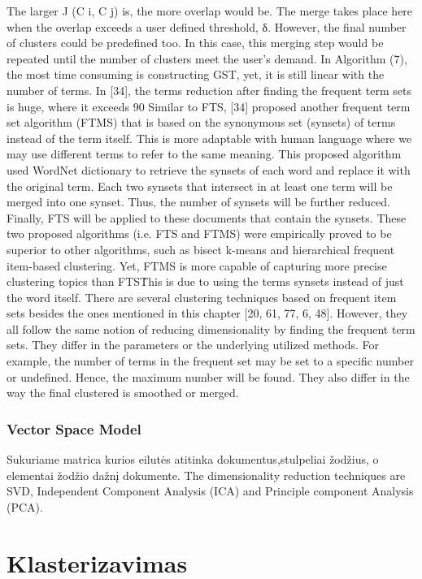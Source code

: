 \documentclass{VUMIFInfKursinis}
\begin{document}
			The larger J (C i, C j) is, the more overlap would be. The merge takes place here when the overlap exceeds a user defined threshold, δ. However, the final number of clusters could be predefined too. In this case, this merging step would be repeated until the number of clusters meet the user’s demand.
			In Algorithm (7), the most time consuming is constructing GST, yet, it is still linear with the number of terms. In [34], the terms reduction after finding the frequent term sets is huge, where it exceeds 90%
			Similar to FTS, [34] proposed another frequent term set algorithm (FTMS) that is based on the synonymous set (synsets) of terms instead of the term itself. This is more adaptable with human language where we may use different terms to refer to the same meaning.  This proposed algorithm used WordNet dictionary to retrieve the synsets of each word and replace it with the original term. Each two synsets that intersect in at least one term will be merged into one synset. Thus, the number of synsets will be further reduced. Finally, FTS will be applied to these documents that contain the synsets.
			These two proposed algorithms (i.e. FTS and FTMS) were empirically proved to be superior to other algorithms, such as bisect k-means and hierarchical frequent item-based clustering. Yet, FTMS is more capable of capturing more precise clustering topics than FTS\. This is due to using the terms synsets instead of just the word itself.
			There are several clustering techniques based on frequent item sets besides the ones mentioned in this chapter [20, 61, 77, 6, 48]. However, they all follow the same notion of reducing dimensionality by finding the frequent term sets. They differ in the parameters or the underlying utilized methods. For example, the number of terms in the frequent set may be set to a specific number or undefined. Hence, the maximum number will be found. They also differ in the way the final clustered is smoothed or merged.

		\subsubsection{Vector Space Model}
			Sukuriame matrica kurios eilutės atitinka dokumentus,stulpeliai žodžius, o elementai žodžio dažnį dokumente.
			The dimensionality reduction techniques are SVD, Independent Component Analysis (ICA) and Principle component Analysis (PCA). 

\section{Klasterizavimas}
\end{document}
